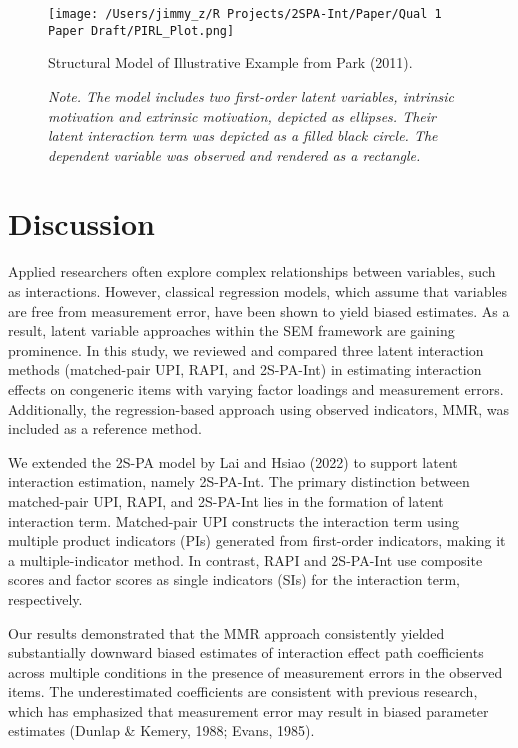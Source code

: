 \documentclass[
  man]{apa6}
\begin{document}
\begin{figure}[h]
\centering
\texttt{[image: /Users/jimmy\_z/R Projects/2SPA-Int/Paper/Qual 1 Paper Draft/PIRL\_Plot.png]}
\caption{Structural Model of Illustrative Example from Park (2011).}
\caption*{\textit{Note. The model includes two first-order latent variables, intrinsic motivation and extrinsic motivation, depicted as ellipses. Their latent interaction term was depicted as a filled black circle. The dependent variable was observed and rendered as a rectangle.}}
\end{figure}

\section{Discussion}\label{discussion}

Applied researchers often explore complex relationships between variables, such as interactions. However, classical regression models, which assume that variables are free from measurement error, have been shown to yield biased estimates. As a result, latent variable approaches within the SEM framework are gaining prominence. In this study, we reviewed and compared three latent interaction methods (matched-pair UPI, RAPI, and 2S-PA-Int) in estimating interaction effects on congeneric items with varying factor loadings and measurement errors. Additionally, the regression-based approach using observed indicators, MMR, was included as a reference method.

We extended the 2S-PA model by Lai and Hsiao (2022) to support latent interaction estimation, namely 2S-PA-Int. The primary distinction between matched-pair UPI, RAPI, and 2S-PA-Int lies in the formation of latent interaction term. Matched-pair UPI constructs the interaction term using multiple product indicators (PIs) generated from first-order indicators, making it a multiple-indicator method. In contrast, RAPI and 2S-PA-Int use composite scores and factor scores as single indicators (SIs) for the interaction term, respectively.

Our results demonstrated that the MMR approach consistently yielded substantially downward biased estimates of interaction effect path coefficients across multiple conditions in the presence of measurement errors in the observed items. The underestimated coefficients are consistent with previous research, which has emphasized that measurement error may result in biased parameter estimates (Dunlap \& Kemery, 1988; Evans, 1985).
\end{document}

